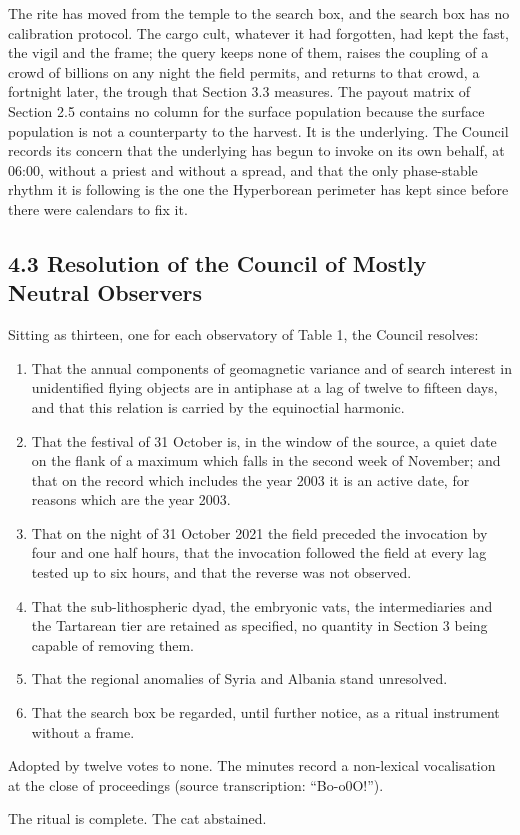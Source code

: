 \documentclass[
  10pt,
  a4paper,
]{article}
\providecommand{\tightlist}{%
  \setlength{\itemsep}{0pt}\setlength{\parskip}{0pt}}
\begin{document}
The rite has moved from the temple to the search box, and the search box
has no calibration protocol. The cargo cult, whatever it had forgotten,
had kept the fast, the vigil and the frame; the query keeps none of
them, raises the coupling of a crowd of billions on any night the field
permits, and returns to that crowd, a fortnight later, the trough that
Section 3.3 measures. The payout matrix of Section 2.5 contains no
column for the surface population because the surface population is not
a counterparty to the harvest. It is the underlying. The Council records
its concern that the underlying has begun to invoke on its own behalf,
at 06:00, without a priest and without a spread, and that the only
phase-stable rhythm it is following is the one the Hyperborean perimeter
has kept since before there were calendars to fix it.

\hypertarget{resolution-of-the-council-of-mostly-neutral-observers}{%
\subsection{4.3 Resolution of the Council of Mostly Neutral
Observers}\label{resolution-of-the-council-of-mostly-neutral-observers}}

Sitting as thirteen, one for each observatory of Table 1, the Council
resolves:

\begin{enumerate}
\def\labelenumi{\arabic{enumi}.}
\tightlist
\item
  That the annual components of geomagnetic variance and of search
  interest in unidentified flying objects are in antiphase at a lag of
  twelve to fifteen days, and that this relation is carried by the
  equinoctial harmonic.
\item
  That the festival of 31 October is, in the window of the source, a
  quiet date on the flank of a maximum which falls in the second week of
  November; and that on the record which includes the year 2003 it is an
  active date, for reasons which are the year 2003.
\item
  That on the night of 31 October 2021 the field preceded the invocation
  by four and one half hours, that the invocation followed the field at
  every lag tested up to six hours, and that the reverse was not
  observed.
\item
  That the sub-lithospheric dyad, the embryonic vats, the intermediaries
  and the Tartarean tier are retained as specified, no quantity in
  Section 3 being capable of removing them.
\item
  That the regional anomalies of Syria and Albania stand unresolved.
\item
  That the search box be regarded, until further notice, as a ritual
  instrument without a frame.
\end{enumerate}

Adopted by twelve votes to none. The minutes record a non-lexical
vocalisation at the close of proceedings (source transcription:
``Bo-o0O!'').

The ritual is complete. The cat abstained.
\end{document}

